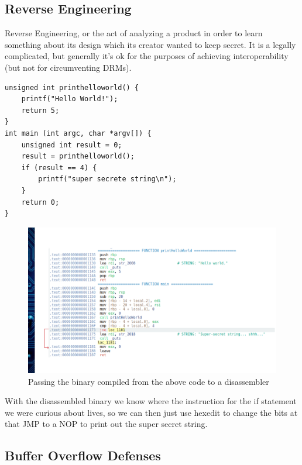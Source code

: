 \documentclass[../notes.tex]{subfiles}
\begin{document}
\subsection{Reverse Engineering}

Reverse Engineering, or the act of analyzing a product in order to learn something about its design which its creator wanted to keep secret.
It is a legally complicated, but generally it's ok for the purposes of achieving interoperability (but not for circumventing DRMs).


\begin{listing}[H]
\begin{verbatim}
unsigned int printhelloworld() {
    printf("Hello World!");
    return 5;
}
int main (int argc, char *argv[]) {
    unsigned int result = 0;
    result = printhelloworld();
    if (result == 4) {
        printf("super secrete string\n");
    }
    return 0;
}
\end{verbatim}
\end{listing}


\begin{figure}[H]
    \centering
    \includegraphics[width=0.8\linewidth]{img/image_2023-01-23-20-35-06.png}
    \caption{Passing the binary compiled from the above code to a disassembler}
\end{figure}

With the disassembled binary we know where the instruction for the if statement we were curious about lives, so we can then just use hexedit to change the bits at that JMP to a NOP to print out the super secret string.


\subsection{Buffer Overflow Defenses}
\end{document}
